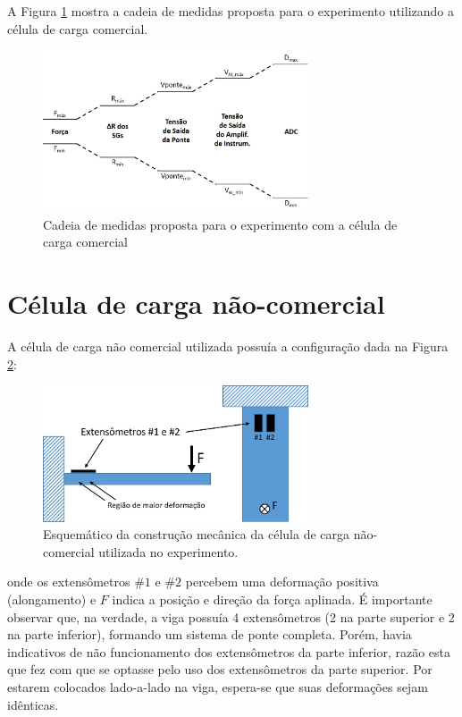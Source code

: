 \documentclass[a4paper]{instrumentacao}
\begin{document}
A Figura \ref{fig:celula-comercial-cadeia-medidas} mostra a cadeia de medidas proposta para o experimento utilizando a célula de carga comercial.

\begin{figure}[H]
\center
\includegraphics[width=0.7\textwidth]{CadeiaMedidasProposta_Celula.jpg}
\caption{Cadeia de medidas proposta para o experimento com a célula de carga comercial}
\label{fig:celula-comercial-cadeia-medidas}
\end{figure}


\section{Célula de carga não-comercial}

A célula de carga não comercial utilizada possuía a configuração dada na Figura \ref{fig:celula-nao-comercial-desenho}:

\begin{figure}[H]
\center
\includegraphics[width=0.7\textwidth]{CelulaNaoComercial_2.jpg}
\caption{Esquemático da construção mecânica da célula de carga não-comercial utilizada no experimento.}
\label{fig:celula-nao-comercial-desenho}
\end{figure}

\noindent onde os extensômetros $\#1$ e $\#2$ percebem uma deformação positiva (alongamento) e $F$ indica a posição e direção da força aplinada. É importante observar que, na verdade, a viga possuía 4 extensômetros (2 na parte superior e 2 na parte inferior), formando um sistema de ponte completa. Porém, havia indicativos de não funcionamento dos extensômetros da parte inferior, razão esta que fez com que se optasse pelo uso dos extensômetros da parte superior. Por estarem colocados lado-a-lado na viga, espera-se que suas deformações sejam idênticas.
\end{document}
